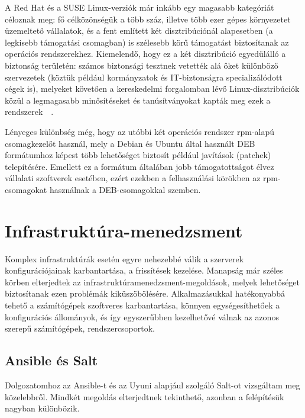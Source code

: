 A Red Hat és a SUSE Linux-verziók már inkább egy magasabb kategóriát céloznak meg: fő célközönségük a több száz, illetve több ezer gépes környezetet üzemeltető vállalatok, és a fent említett két disztribúciónál alapesetben (a legkisebb támogatási csomagban) is szélesebb körű támogatást biztosítanak az operációs rendszerekhez. Kiemelendő, hogy ez a két disztribúció egyedülálló a biztonság területén: számos biztonsági tesztnek vetették alá őket különböző szervezetek (köztük például kormányzatok és IT-biztonságra specializálódott cégek is), melyeket követően a kereskedelmi forgalomban lévő Linux-disztribúciók közül a legmagasabb minősítéseket és tanúsítványokat kapták meg ezek a rendszerek~\cite{RhSec}~\cite{SlesSec}.

Lényeges különbség még, hogy az utóbbi két operációs rendszer \acrshort{rpm}-alapú csomagkezelőt használ, mely a Debian és Ubuntu által használt DEB formátumhoz képest több lehetőséget biztosít például javítások (patchek) telepítésére. Emellett ez a formátum általában jobb támogatottságot élvez vállalati szoftverek esetében, ezért ezekben a felhasználási körökben az \acrshort{rpm}-csomagokat használnak a DEB-csomagokkal szemben.


\section{Infrastruktúra-menedzsment}
Komplex infrastruktúrák esetén egyre nehezebbé válik a szerverek konfigurációjainak karbantartása, a frissítések kezelése. Manapság már széles körben elterjedtek az infrastruktúramenedzsment-megoldások, melyek lehetőséget biztosítanak ezen problémák kiküszöbölésére. Alkalmazásukkal hatékonyabbá tehető a számítógépek szoftveres karbantartása, könnyen egységesíthetőek a konfigurációs állományok, és így egyszerűbben kezelhetővé válnak az azonos szerepű számítógépek, rendszercsoportok.

\subsection{Ansible és Salt}
Dolgozatomhoz az Ansible-t és az Uyuni alapjául szolgáló Salt-ot vizsgáltam meg közelebbről. Mindkét megoldás elterjedtnek tekinthető, azonban a felépítésük nagyban különbözik.

